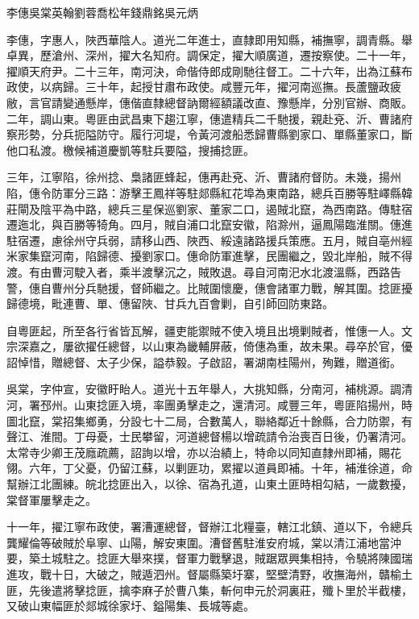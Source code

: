 
\begin{pinyinscope}
李僡吳棠英翰劉蓉喬松年錢鼎銘吳元炳

李僡，字惠人，陜西華陰人。道光二年進士，直隸即用知縣，補撫寧，調青縣。舉卓異，歷滄州、深州，擢大名知府。調保定，擢大順廣道，遷按察使。二十一年，擢順天府尹。二十三年，南河決，命偕侍郎成剛馳往督工。二十六年，出為江蘇布政使，以病歸。三十年，起授甘肅布政使。咸豐元年，擢河南巡撫。長蘆鹽政疲敝，言官請變通懸岸，僡偕直隸總督訥爾經額議改直、豫懸岸，分別官辦、商販。二年，調山東。粵匪由武昌東下趨江寧，僡遣精兵二千馳援，親赴兗、沂、曹諸府察形勢，分兵扼隘防守。履行河堤，令黃河渡船悉歸曹縣劉家口、單縣董家口，斷他口私渡。檄候補道慶凱等駐兵要隘，搜捕捻匪。

三年，江寧陷，徐州捻、梟諸匪蜂起，僡再赴兗、沂、曹諸府督防。未幾，揚州陷，僡令防軍分三路：游擊王鳳祥等駐郯縣紅花埠為東南路，總兵百勝等駐嶧縣韓莊閘及陰平為中路，總兵三星保巡劉家、董家二口，遏賊北竄，為西南路。傳駐宿遷迤北，與百勝等犄角。四月，賊自浦口北竄安徽，陷滁州，逼鳳陽臨淮關。僡進駐宿遷，慮徐州守兵弱，請移山西、陜西、綏遠諸路援兵策應。五月，賊自亳州經米家集竄河南，陷歸德、擾劉家口。僡命防軍進擊，民團繼之，毀北岸船，賊不得渡。有由曹河駛入者，乘半渡擊沉之，賊敗退。尋自河南汜水北渡溫縣，西路告警，僡自曹州分兵馳援，督師繼之。比賊圍懷慶，僡會諸軍力戰，解其圍。捻匪擾歸德境，毗連曹、單、僡留陜、甘兵九百會剿，自引師回防東路。

自粵匪起，所至各行省皆瓦解，疆吏能禦賊不使入境且出境剿賊者，惟僡一人。文宗深嘉之，屢欲擢任總督，以山東為畿輔屏蔽，倚僡為重，故未果。尋卒於官，優詔悼惜，贈總督、太子少保，謚恭毅。子啟詔，署湖南桂陽州，殉難，贈道銜。

吳棠，字仲宣，安徽盱眙人。道光十五年舉人，大挑知縣，分南河，補桃源。調清河，署邳州。山東捻匪入境，率團勇擊走之，還清河。咸豐三年，粵匪陷揚州，時圖北竄，棠招集鄉勇，分設七十二局，合數萬人，聯絡鄰近十餘縣，合力防禦，有聲江、淮間。丁母憂，士民攀留，河道總督楊以增疏請令治喪百日後，仍署清河。太常寺少卿王茂廕疏薦，詔詢以增，亦以治績上，特命以同知直隸州即補，賜花翎。六年，丁父憂，仍留江蘇，以剿匪功，累擢以道員即補。十年，補淮徐道，命幫辦江北團練。皖北捻匪出入，以徐、宿為孔道，山東土匪時相勾結，一歲數擾，棠督軍屢擊走之。

十一年，擢江寧布政使，署漕運總督，督辦江北糧臺，轄江北鎮、道以下，令總兵龔耀倫等破賊於阜寧、山陽，解安東圍。漕督舊駐淮安府城，棠以清江浦地當沖要，築土城駐之。捻匪大舉來撲，督軍力戰擊退，賊踞眾興集相持，令驍將陳國瑞進攻，戰十日，大破之，賊遁泗州。督屬縣築圩寨，堅壁清野，收撫海州，贛榆土匪，先後遣將擊捻匪，擒李麻子於曹八集，斬何申元於洞裏莊，殲卜里於半截樓，又破山東幅匪於郯城徐家圩、鎰陽集、長城等處。


\end{pinyinscope}
